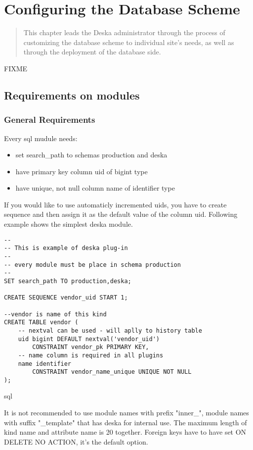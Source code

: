 \documentclass[deska]{subfiles}
\begin{document}
\chapter{Configuring the Database Scheme}
\label{sec:admin-dbscheme}

\begin{abstract}
This chapter leads the Deska administrator through the process of customizing the database scheme to individual site's
needs, as well as through the deployment of the database side.
\end{abstract}

\label{sec:db-scheme-req}
FIXME

\section{Requirements on modules}

\subsection{General Requirements}
Every sql mudule needs:

\begin{itemize}
    \item set search\_path to schemas production and deska
    \item have primary key column uid of bigint type
    \item have unique, not null column name of identifier type
\end{itemize}

If you would like to use automaticly incremented uids, you have to create sequence and then assign it as the default value of the column uid.
Following example shows the simplest deska module.

\begin{verbatim}
--
-- This is example of deska plug-in
--
-- every module must be place in schema production
--
SET search_path TO production,deska;

CREATE SEQUENCE vendor_uid START 1;

--vendor is name of this kind
CREATE TABLE vendor (
    -- nextval can be used - will aplly to history table
    uid bigint DEFAULT nextval('vendor_uid')
        CONSTRAINT vendor_pk PRIMARY KEY,
    -- name column is required in all plugins
    name identifier
        CONSTRAINT vendor_name_unique UNIQUE NOT NULL
);
\end{verbatim}{sql}

It is not recommended to use module names with prefix "inner\_", module names with suffix "\_template" that has deska for internal use.
The maximum length of kind name and attribute name is 20 together.
Foreign keys have to have set ON DELETE NO ACTION, it's the default option.
\end{document}
